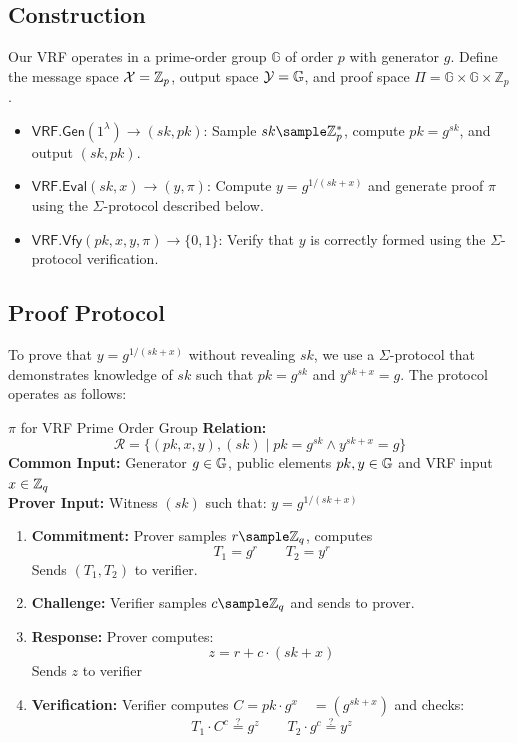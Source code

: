 \subsection{Construction}
Our VRF operates in a prime-order group $\mathbb{G}$ of order $p$ with generator $g$. Define the message space $\mathcal{X} = \mathbb{Z}_p$, output space $\mathcal{Y} = \mathbb{G}$, and proof space $\Pi = \mathbb{G} \times \mathbb{G} \times \mathbb{Z}_p$. 


\begin{itemize}
    \item $\mathsf{VRF.Gen}(1^\lambda) \to (sk, pk)$:  
    Sample $sk \sample \mathbb{Z}_p^*$, compute $pk = g^{sk}$, and output $(sk, pk)$.
    
    \item $\mathsf{VRF.Eval}(sk, x) \to (y, \pi)$:  
    Compute $y = g^{1/(sk + x)}$ and generate proof $\pi$ using the $\Sigma$-protocol described below.
    
    \item $\mathsf{VRF.Vfy}(pk, x, y, \pi) \to \{0,1\}$:
    Verify that $y$ is correctly formed using the $\Sigma$-protocol verification.
\end{itemize}


\subsection{Proof Protocol}
To prove that $y = g^{1/(sk+x)}$ without revealing $sk$, we use a $\Sigma$-protocol that demonstrates knowledge of $sk$ such that $pk = g^{sk}$ and $y^{sk+x} = g$. The protocol operates as follows:

\begin{protocol}{$\pi$ for VRF Prime Order Group}{}\label{pok-vrf-prime-order-group}
\textbf{Relation: }
\[
\mathcal{R} = \{(pk, x, y), (sk) \mid pk = g^{sk} \wedge y^{sk+x} = g\}
\]
\textbf{Common Input:} Generator $g \in \mathbb{G}$, public elements $pk, y \in \mathbb{G}$ and VRF input $x \in \mathbb{Z}_q$\\
\textbf{Prover Input:} Witness $(sk)$ such that: $y = g^{1/(sk + x)}$
\begin{enumerate}
    \item \textbf{Commitment:} Prover samples $r \sample \Z_q$, computes 
    \[
    T_1 = g^r \qquad T_2 = y^r
    \]
    Sends $(T_1, T_2)$ to verifier.
    
    \item \textbf{Challenge:} Verifier samples $c \sample \mathbb{Z}_q$ and sends to prover.
    
    \item \textbf{Response:} Prover computes:
    \[
    z = r + c \cdot (sk + x)
    \]
    Sends $z$ to verifier
    
    \item \textbf{Verification:} Verifier computes $C = pk \cdot g^x \quad =(g^{sk + x})$ and checks:
    \[
    T_1 \cdot C^c \stackrel{?}{=} g^z \qquad T_2 \cdot g^c \stackrel{?}{=} y^z
    \]
 
\end{enumerate}
\end{protocol}

